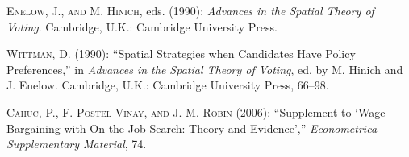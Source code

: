\documentclass[ecta,nameyear,draft]{econsocart}
\theoremstyle{plain}
\theoremstyle{remark}
\begin{document}
\begin{thebibliography}{}
\textsc{Enelow, J., and M. Hinich}, eds. (1990):
\textit{Advances in the Spatial Theory of Voting}.
Cambridge, U.K.: Cambridge University Press.
\endbibitem

\textsc{Wittman, D.} (1990):
``Spatial Strategies when Candidates Have Policy Preferences,''
in \textit{Advances in the Spatial Theory of Voting},
ed. by M. Hinich and J. Enelow.
Cambridge, U.K.: Cambridge University Press, 66--98.
\endbibitem

\textsc{Cahuc, P., F. Postel-Vinay, and J.-M. Robin} (2006): 
``Supplement to `Wage Bargaining with On-the-Job Search: Theory and Evidence',''
\textit{Econometrica Supplementary Material}, 74.
\endbibitem
\end{thebibliography}
\end{document}
